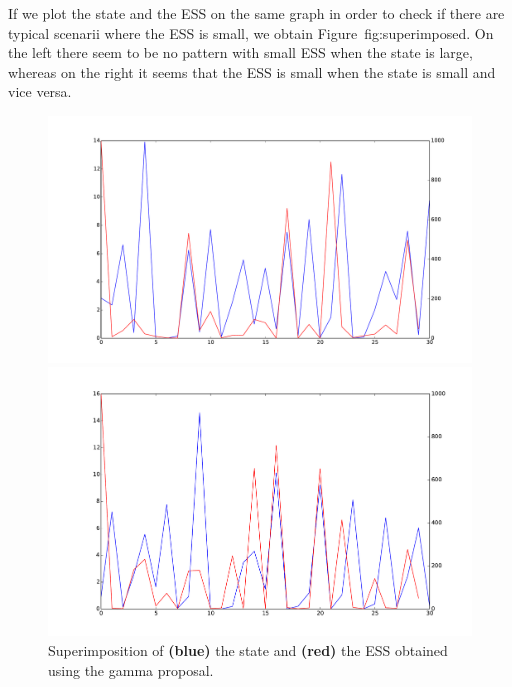 \documentclass{article}
\begin{document}
If we plot the state and the ESS on the same graph in order to check if there are typical scenarii where the ESS is small, we obtain Figure~{fig:superimposed}. On the left there seem to be no pattern with small ESS when the state is large, whereas on the right it seems that the ESS is small when the state is small and vice versa.

\begin{figure}[htb]
	\centering
	\begin{minipage}{.45\textwidth}
		\centering
		\includegraphics[width=0.97\linewidth]{bootstrap-filter/comparison_ESS_state.pdf}
	\end{minipage}
	\begin{minipage}{.45\textwidth}
		\centering
		\includegraphics[width=0.97\linewidth]{bootstrap-filter/comparison_ESS_state2.pdf}
	\end{minipage}
	\caption{Superimposition of \textbf{(blue)} the state and \textbf{(red)} the ESS obtained using the gamma proposal.}
	\label{fig:superimposed}
\end{figure}
\end{document}

